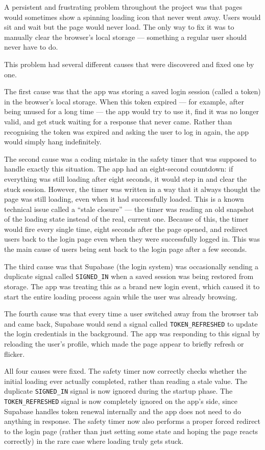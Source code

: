 \documentclass[12pt, a4paper]{article}
\begin{document}
A persistent and frustrating problem throughout the project was that pages would sometimes show a spinning loading icon that never went away. Users would sit and wait but the page would never load. The only way to fix it was to manually clear the browser's local storage --- something a regular user should never have to do.

This problem had several different causes that were discovered and fixed one by one.

The first cause was that the app was storing a saved login session (called a token) in the browser's local storage. When this token expired --- for example, after being unused for a long time --- the app would try to use it, find it was no longer valid, and get stuck waiting for a response that never came. Rather than recognising the token was expired and asking the user to log in again, the app would simply hang indefinitely.

The second cause was a coding mistake in the safety timer that was supposed to handle exactly this situation. The app had an eight-second countdown: if everything was still loading after eight seconds, it would step in and clear the stuck session. However, the timer was written in a way that it always thought the page was still loading, even when it had successfully loaded. This is a known technical issue called a ``stale closure'' --- the timer was reading an old snapshot of the loading state instead of the real, current one. Because of this, the timer would fire every single time, eight seconds after the page opened, and redirect users back to the login page even when they were successfully logged in. This was the main cause of users being sent back to the login page after a few seconds.

The third cause was that Supabase (the login system) was occasionally sending a duplicate signal called \texttt{SIGNED\_IN} when a saved session was being restored from storage. The app was treating this as a brand new login event, which caused it to start the entire loading process again while the user was already browsing.

The fourth cause was that every time a user switched away from the browser tab and came back, Supabase would send a signal called \texttt{TOKEN\_REFRESHED} to update the login credentials in the background. The app was responding to this signal by reloading the user's profile, which made the page appear to briefly refresh or flicker.

All four causes were fixed. The safety timer now correctly checks whether the initial loading ever actually completed, rather than reading a stale value. The duplicate \texttt{SIGNED\_IN} signal is now ignored during the startup phase. The \texttt{TOKEN\_REFRESHED} signal is now completely ignored on the app's side, since Supabase handles token renewal internally and the app does not need to do anything in response. The safety timer now also performs a proper forced redirect to the login page (rather than just setting some state and hoping the page reacts correctly) in the rare case where loading truly gets stuck.
\end{document}

